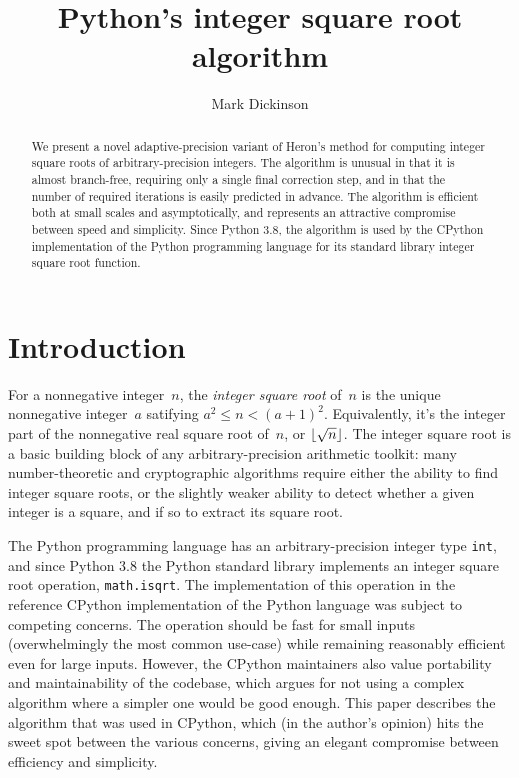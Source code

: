 \documentclass[a4paper]{article}
\title{Python's integer square root algorithm}
\author{Mark Dickinson}
\DeclarePairedDelimiter\floor{\lfloor}{\rfloor}
\theoremstyle{plain}
\theoremstyle{definition}
\begin{document}
\lstset{language=Python}
\maketitle
\begin{abstract}
We present a novel adaptive-precision variant of Heron's method for computing
integer square roots of arbitrary-precision integers. The algorithm is unusual
in that it is almost branch-free, requiring only a single final correction
step, and in that the number of required iterations is easily predicted in
advance. The algorithm is efficient both at small scales and asymptotically,
and represents an attractive compromise between speed and simplicity. Since
Python 3.8, the algorithm is used by the CPython implementation of the Python
programming language for its standard library integer square root function.
\end{abstract}
\section{Introduction}

For a nonnegative integer~$n$, the \emph{integer square root} of~$n$ is the
unique nonnegative integer~$a$ satifying $a^2 \le n < (a + 1)^2$. Equivalently,
it's the integer part of the nonnegative real square root of~$n$, or
$\floor{\sqrt n}$. The integer square root is a basic building block of any
arbitrary-precision arithmetic toolkit: many number-theoretic and cryptographic
algorithms require either the ability to find integer square roots, or the
slightly weaker ability to detect whether a given integer is a square, and if
so to extract its square root.

The Python programming language has an arbitrary-precision integer type
\lstinline$int$, and since Python 3.8 the Python standard library implements an
integer square root operation, \lstinline$math.isqrt$. The implementation of
this operation in the reference CPython implementation of the Python language
was subject to competing concerns. The operation should be fast for small
inputs (overwhelmingly the most common use-case) while remaining reasonably
efficient even for large inputs. However, the CPython maintainers also value
portability and maintainability of the codebase, which argues for not using a
complex algorithm where a simpler one would be good enough. This paper
describes the algorithm that was used in CPython, which (in the author's
opinion) hits the sweet spot between the various concerns, giving an elegant
compromise between efficiency and simplicity.
\end{document}
